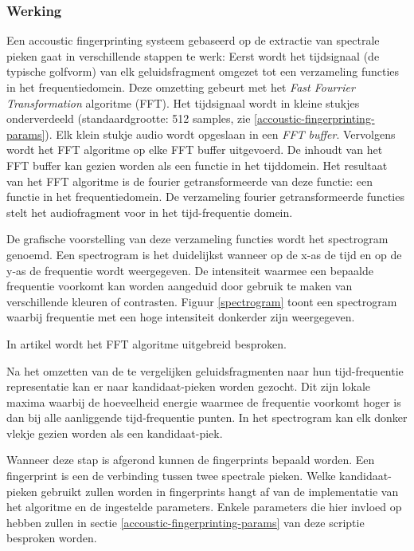 \subsubsection{Werking}

Een accoustic fingerprinting systeem gebaseerd op de extractie van spectrale pieken gaat in verschillende stappen te werk: 
Eerst wordt het tijdsignaal (de typische golfvorm) van elk geluidsfragment omgezet tot een verzameling functies in het frequentiedomein. Deze omzetting gebeurt met het \textit{Fast Fourrier Transformation} algoritme (FFT). Het tijdsignaal wordt in kleine stukjes onderverdeeld (standaardgrootte: 512 samples, zie \ref{accoustic-fingerprinting-params}). Elk klein stukje audio wordt opgeslaan in een \textit{FFT buffer}. Vervolgens wordt het FFT algoritme op elke FFT buffer uitgevoerd. De inhoudt van het FFT buffer kan gezien worden als een functie in het tijddomein. Het resultaat van het FFT algoritme is de fourier getransformeerde van deze functie: een functie in het frequentiedomein.
De verzameling fourier getransformeerde functies stelt het audiofragment voor in het tijd-frequentie domein. 

De grafische voorstelling van deze verzameling functies wordt het spectrogram genoemd. Een spectrogram is het duidelijkst wanneer op de x-as de tijd en op de y-as de frequentie wordt weergegeven. De intensiteit waarmee een bepaalde frequentie voorkomt kan worden aangeduid door gebruik te maken van verschillende kleuren of contrasten. Figuur \ref{spectrogram} toont een spectrogram waarbij frequentie met een hoge intensiteit donkerder zijn weergegeven.

In artikel \cite{oppenheim1970speech} wordt het FFT algoritme uitgebreid besproken.

Na het omzetten van de te vergelijken geluidsfragmenten naar hun tijd-frequentie representatie kan er naar kandidaat-pieken worden gezocht. Dit zijn lokale maxima waarbij de hoeveelheid energie waarmee de frequentie voorkomt hoger is dan bij alle aanliggende tijd-frequentie punten\cite{six2014panako}. In het spectrogram kan elk donker vlekje gezien worden als een kandidaat-piek.

Wanneer deze stap is afgerond kunnen de fingerprints bepaald worden. Een fingerprint is een de verbinding tussen twee spectrale pieken. Welke kandidaat-pieken gebruikt zullen worden in fingerprints hangt af van de implementatie van het algoritme en de ingestelde parameters. Enkele parameters die hier invloed op hebben zullen in sectie \ref{accoustic-fingerprinting-params} van deze scriptie besproken worden.

